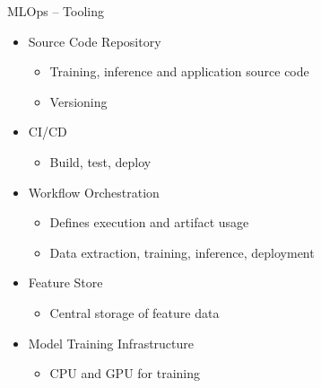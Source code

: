 \documentclass[ignorenonframetext,xcolor=x11names]{beamer}
\begin{document}
\begin{frame}{MLOps -- Tooling}
\begin{itemize}
  \item Source Code Repository
  \begin{itemize}
  \footnotesize
     \item Training, inference and application source code
     \item Versioning
  \end{itemize}
  \item CI/CD
  \begin{itemize}
  \footnotesize
     \item Build, test, deploy
  \end{itemize}
  \item Workflow Orchestration
  \begin{itemize}
  \footnotesize
     \item Defines execution and artifact usage
     \item Data extraction, training, inference, deployment
  \end{itemize}
  \item Feature Store
  \begin{itemize}
  \footnotesize
     \item Central storage of feature data
  \end{itemize}
  \item Model Training Infrastructure
  \begin{itemize}
  \footnotesize
     \item CPU and GPU for training
  \end{itemize}
\end{itemize}
\end{frame}
\end{document}
